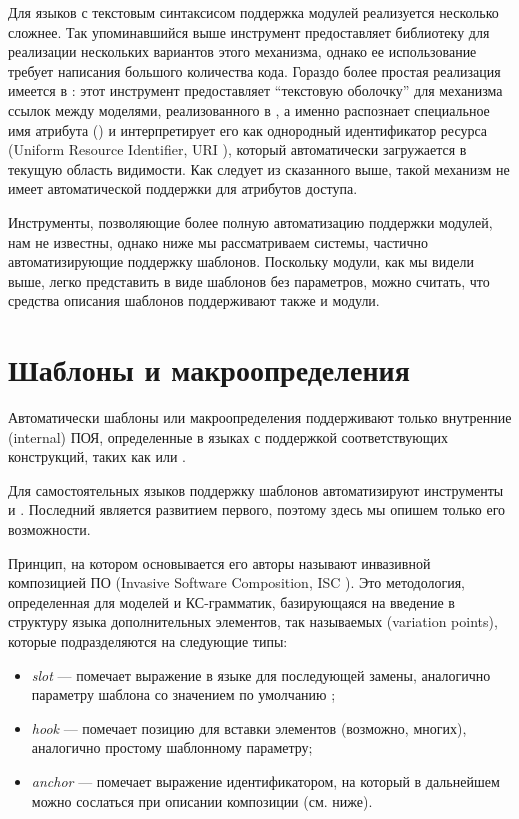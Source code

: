 Для языков с текстовым синтаксисом поддержка модулей реализуется несколько сложнее. Так упоминавшийся выше инструмент  \cite{Eli} предоставляет библиотеку для реализации нескольких вариантов этого механизма, однако ее использование требует написания большого количества кода. Гораздо более простая реализация имеется в  \cite{xText}: этот инструмент предоставляет ``текстовую оболочку'' для механизма ссылок между моделями, реализованного в , а именно распознает специальное имя атрибута () и интерпретирует его как однородный идентификатор ресурса (Uniform Resource Identifier, URI \cite{uri}), который автоматически загружается в текущую область видимости. Как следует из сказанного выше, такой механизм не имеет автоматической поддержки для атрибутов доступа.

Инструменты, позволяющие более полную автоматизацию поддержки модулей, нам не известны, однако ниже мы рассматриваем системы, частично автоматизирующие поддержку шаблонов. Поскольку модули, как мы видели выше, легко представить в виде шаблонов без параметров, можно считать, что средства описания шаблонов поддерживают также и модули.

\section{Шаблоны и макроопределения}

Автоматически шаблоны или макроопределения поддерживают только внутренние (internal) ПОЯ, определенные в языках с поддержкой соответствующих конструкций, таких как  или .

Для самостоятельных языков поддержку шаблонов автоматизируют инструменты  \cite{COMPOST} и  \cite{Reuseware}. Последний является развитием первого, поэтому здесь мы опишем только его возможности.
 
Принцип, на котором основывается  его авторы называют инвазивной композицией ПО (Invasive Software Composition, ISC \cite{ISC}). Это методология, определенная для моделей и КС-грамматик, базирующаяся на введение в структуру языка дополнительных элементов, так называемых  (variation points), которые подразделяются на следующие типы:
\begin{itemize}
\item \emph{slot} --- помечает выражение в языке для последующей замены, аналогично параметру шаблона со значением по умолчанию \cite{C++};
\item \emph{hook} --- помечает позицию для вставки элементов (возможно, многих), аналогично простому шаблонному параметру;
\item \emph{anchor} --- помечает выражение идентификатором, на который в дальнейшем можно сослаться при описании композиции (см. ниже).
\end{itemize}

